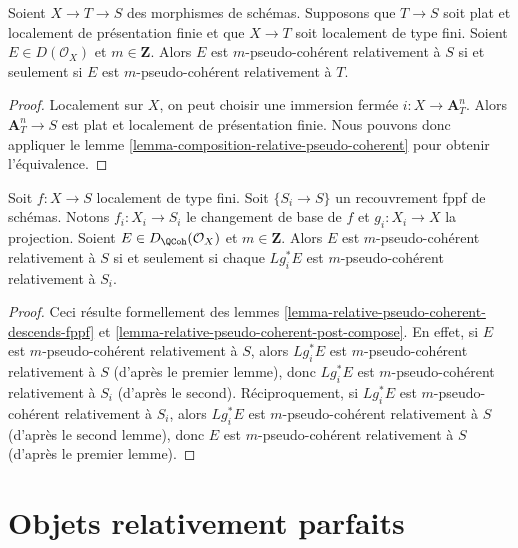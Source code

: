 \begin{lemma}
\label{lemma-relative-pseudo-coherent-post-compose}
Soient $X \to T \to S$ des morphismes de schémas. Supposons que $T \to S$
soit plat et localement de présentation finie et que $X \to T$ soit
localement de type fini. Soient $E \in D(\mathcal{O}_X)$ et $m \in \mathbf{Z}$.
Alors $E$ est $m$-pseudo-cohérent relativement à $S$
si et seulement si $E$ est $m$-pseudo-cohérent relativement à $T$.
\end{lemma}

\begin{proof}
Localement sur $X$, on peut choisir une immersion fermée $i : X \to \mathbf{A}^n_T$.
Alors $\mathbf{A}^n_T \to S$ est plat et localement de présentation finie.
Nous pouvons donc
appliquer le lemme \ref{lemma-composition-relative-pseudo-coherent}
pour obtenir l'équivalence.
\end{proof}

\begin{lemma}
\label{lemma-relative-pseudo-coherent-descends-fppf-base}
Soit $f : X \to S$ localement de type fini.
Soit $\{S_i \to S\}$ un recouvrement fppf de schémas.
Notons $f_i : X_i \to S_i$ le changement de base de $f$
et $g_i : X_i \to X$ la projection.
Soient $E \in D_\QCoh(\mathcal{O}_X)$ et $m \in \mathbf{Z}$.
Alors $E$ est $m$-pseudo-cohérent relativement à $S$
si et seulement si chaque $Lg_i^*E$ est $m$-pseudo-cohérent relativement à $S_i$.
\end{lemma}

\begin{proof}
Ceci résulte formellement des
lemmes \ref{lemma-relative-pseudo-coherent-descends-fppf} et
\ref{lemma-relative-pseudo-coherent-post-compose}.
En effet, si $E$ est $m$-pseudo-cohérent relativement à $S$,
alors $Lg_i^*E$ est $m$-pseudo-cohérent relativement à $S$ (d'après le premier lemme),
donc $Lg_i^*E$ est $m$-pseudo-cohérent relativement à $S_i$ (d'après le second).
Réciproquement, si
$Lg_i^*E$ est $m$-pseudo-cohérent relativement à $S_i$, alors
$Lg_i^*E$ est $m$-pseudo-cohérent relativement à $S$ (d'après le second lemme),
donc $E$ est $m$-pseudo-cohérent relativement à $S$ (d'après le premier lemme).
\end{proof}






\section{Objets relativement parfaits}
\label{section-relatively-perfect}

